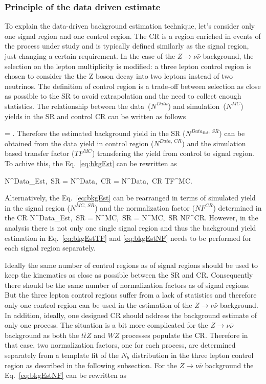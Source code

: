 \subsubsection{Principle of the data driven estimate}

To explain the data-driven background estimation technique, let's consider only one signal region and one control region. The CR is a region enriched in events of the process under study and is typically defined similarly as the signal region, just changing a certain requirement. In the case of the $Z \to \nu \bar{\nu}$ background, the selection on the lepton multiplicity is modified: a three lepton control region is chosen to consider the the Z boson decay into two leptons instead of two neutrinos. The definition of control region is a trade-off between selection as close as possible to the SR to avoid extrapolation and the need to collect enough statistics. The relationship between the data~($N^{Data}$) and simulation~($N^{MC}$) yields in the SR and control CR can be written as follows

{
  = .
}
Therefore the estimated background yield in the SR ($N^{Data_{Est},~SR}$) can be obtained from the data yield in control region ($N^{Data,~CR}$) and the simulation based transfer factor ($TF^{MC}$) transfering the yield from control to signal region. To achive this, the Eq.~\ref{eq:bkgEst} can be rewritten as

{
N^{Data_{Est},~SR}  = N^{Data,~CR} \times  {} = N^{Data,~CR} \times  TF^{MC}.
}

Alternatively, the Eq.~\ref{eq:bkgEst} can be rearranged in terms of simulated yield in the signal region ($N^{MC,~SR}$) and the normalization factor ($NF^{CR}$) determined in the CR
{
N^{Data_{Est},~SR}  = N^{MC,~SR} \times  {} = N^{MC,~SR} \times  NF^{CR}.
}
However, in the analysis there is not only one single signal region and thus the background yield estimation in Eq.~\ref{eq:bkgEstTF} and \ref{eq:bkgEstNF} needs to be performed for each signal region separately. 

Ideally the same number of control regions as of signal regions should be used to keep the kinematics as close as possible between the SR and CR. Consequently there should be the same number of normalization factors as of signal regions.  But the three lepton control regions suffer from a lack of statistics and therefore  only one control region can be used in the estimation of the $Z \to \nu \bar{\nu}$ background. In addition, ideally, one designed  CR should address the background estimate of only one process. The situation is a bit more complicated for the $Z \to \nu \bar{\nu}$ background as both the  $t\bar{t}Z$ and $WZ$ processes populate the CR.  Therefore in that case, two normalization factors, one for each process, are determined separately  from a template fit of the $N_{b}$ distribution in the three lepton control region as described in the following subsection. For the $Z \to \nu \bar{\nu}$ background the Eq.~\ref{eq:bkgEstNF} can be rewritten as

